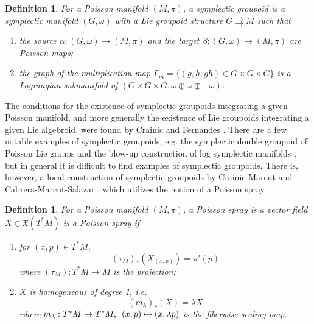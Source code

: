 \documentclass{amsart}
\newtheorem{definition}[theorem]{Definition}
\begin{document}
\begin{definition}
For a Poisson manifold $(M, \pi)$, a symplectic groupoid is a symplectic manifold $(G, \omega)$ with a Lie groupoid structure $G \rightrightarrows M$ such that
	\begin{enumerate}
		\item the source $\alpha: (G, \omega) \to (M, \pi)$ and the target $\beta: (G, \omega) \to (M, \pi)$ are Poisson maps;
		\item the graph of the multiplication map $\Gamma_m = \{(g, h, gh) \in G \times G \times G\}$ is a Lagrangian submanifold of $(G \times G \times G, \omega \oplus \omega \oplus -\omega)$.
	\end{enumerate}
\end{definition}

The conditions for the existence of symplectic groupoids integrating a given Poisson manifold, and more generally the existence of Lie groupoids integrating a given Lie algebroid, were found by Crainic and Fernandes \cite{MR1973056, MR2128714}. There are a few notable examples of symplectic groupoids, e.g. the symplectic double groupoid of Poisson Lie groups \cite{MR1054741} and the blow-up construction of log symplectic manifolds \cite{MR3214314}, but in general it is difficult to find examples of symplectic groupoids. There is, however, a local construction of symplectic groupoids by Crainic-Marcut \cite{MR2900786} and Cabrera-Marcut-Salazar \cite{CMS17}, which utilizes the notion of a Poisson spray.

\begin{definition}
For a Poisson manifold $(M, \pi)$, a Poisson spray is a vector field $X \in \mathfrak{X}(T^*M)$ is a Poisson spray if
	\begin{enumerate}
		\item for $(x,p) \in T^*M$,
			$$
				(\tau_M)_*\left(X_{(x,p)} \right) = \pi^\flat(p)
			$$
			where $(\tau_M): T^*M \to M$ is the projection;
		\item
			$X$ is homogeneous of degree 1, i.e.
			$$
				(m_\lambda)_*(X) = \lambda X 
			$$
			where $m_\lambda: T^*M \to T^*M, \enskip (x,p) \mapsto (x,\lambda p)$ is the fiberwise scaling map.
	\end{enumerate}
\end{definition}
\end{document}
